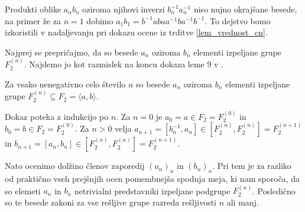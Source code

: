 \begin{opomba}
Produkti oblike $a_n b_n$ oziroma njihovi inverzi $b_n ^{-1} a_n ^{-1}$ niso nujno okrajšane besede, na primer že za $n = 1$ dobimo $a_1 b_1 = b^{-1} a b a a^{-1} b a^{-1} b^{-1}$. To dejstvo bomo izkoristili v nadaljevanju pri dokazu ocene iz trditve \ref{lem_vrednost_cn}. 
\end{opomba}

Najprej se prepričajmo, da so besede $a_n$ oziroma $b_n$ elementi izpeljane grupe $F_2^{(n)}$. Najdemo jo kot razmislek na koncu dokaza leme 9 v \cite[str.~14]{Schneider_2016}.

\begin{lema}
\label{lem_besede_ab_so_elementi_izpeljane_grupe}
Za vsako nenegativno celo število $n$ so besede $a_n$ oziroma $b_n$ elementi izpeljane grupe $F_2^{(n)} \subseteq F_2 = \langle a , b \rangle$.
\end{lema}
\begin{dokaz}
    Dokaz poteka z indukcijo po $n$. Za $n = 0$ je $a_0 = a \in F_2 = F_2^{(0)}$ in $b_0 = b \in F_2 = F_2^{(0)}$. Za $n > 0$ velja $a_{n + 1} = [b_n^{-1}, a_n] \in \left[ F_2^{(n)}, F_2^{(n)} \right] = F_2^{(n + 1)}$ in $b_{n+1} = [a_{n}, b_{n}] \in  \left[ F_2^{(n)}, F_2^{(n)} \right] = F_2^{(n + 1)}$. 
\end{dokaz}

Nato ocenimo dolžino členov zaporedij $(a_{n})_n$ in $(b_{n})_n$. Pri tem je za razliko od praktično vseh prejšnjih ocen pomembnejša spodnja meja, ki nam sporoča, da so elemeti $a_n$ in $b_n$ netrivialni predstavniki
izpeljane podgrupe $F_2^{(n)}$. Posledično so te besede zakoni za vse rešljive grupe razreda rešljivosti $n$ ali manj.

